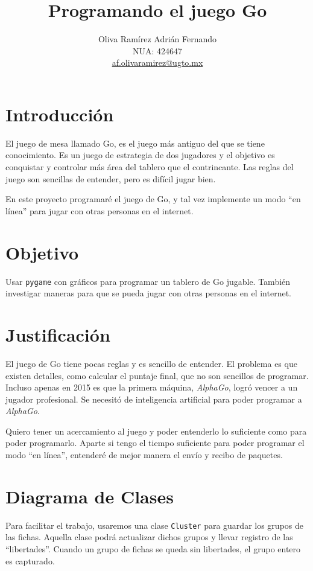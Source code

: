 \documentclass[10pt,letterpaper]{article}
\title{Programando el juego Go}
\author{Oliva Ramírez Adrián Fernando \\ NUA: 424647 \\ \href{mailto:af.olivaramirez@ugto.mx}{af.olivaramirez@ugto.mx}}
\theoremstyle{definition}
\begin{document}
\maketitle

\section{Introducci\'on}

El juego de mesa llamado Go, es el juego m\'as antiguo del que se tiene conocimiento. Es un juego de estrategia de dos jugadores y el objetivo es conquistar y controlar m\'as \'area del tablero que el contrincante. Las reglas del juego son sencillas de entender, pero es dif\'icil jugar bien.

En este proyecto programar\'e el juego de Go, y tal vez implemente un modo ``en l\'inea'' para jugar con otras personas en el internet.

\section{Objetivo}

Usar \verb|pygame| con gr\'aficos para programar un tablero de Go jugable. Tambi\'en investigar maneras para que se pueda jugar con otras personas en el internet.

\section{Justificaci\'on}

El juego de Go tiene pocas reglas y es sencillo de entender. El problema es que existen detalles, como calcular el puntaje final, que no son sencillos de programar. Incluso apenas en 2015 es que la primera m\'aquina, \textit{AlphaGo}, logr\'o vencer a un jugador profesional. Se necesit\'o de inteligencia artificial para poder programar a \textit{AlphaGo}.

Quiero tener un acercamiento al juego y poder entenderlo lo suficiente como para poder programarlo. Aparte si tengo el tiempo suficiente para poder programar el modo ``en l\'inea'', entender\'e de mejor manera el env\'io y recibo de paquetes.

\section{Diagrama de Clases}

Para facilitar el trabajo, usaremos una clase \verb|Cluster| para guardar los grupos de las fichas. Aquella clase podr\'a actualizar dichos grupos y llevar registro de las ``libertades''. Cuando un grupo de fichas se queda sin libertades, el grupo entero es capturado.
\end{document}
